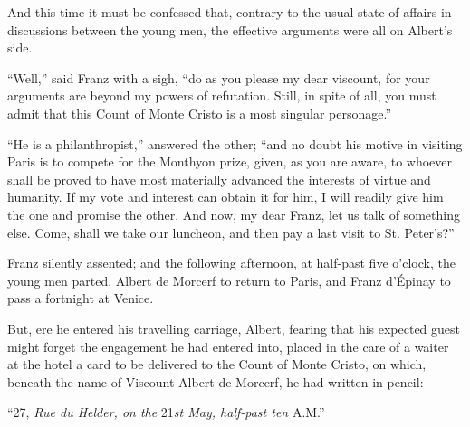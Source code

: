 And this time it must be confessed that, contrary to the usual state of
affairs in discussions between the young men, the effective arguments
were all on Albert’s side.

“Well,” said Franz with a sigh, “do as you please my dear viscount, for
your arguments are beyond my powers of refutation. Still, in spite of
all, you must admit that this Count of Monte Cristo is a most singular
personage.”

“He is a philanthropist,” answered the other; “and no doubt his motive
in visiting Paris is to compete for the Monthyon prize, given, as you
are aware, to whoever shall be proved to have most materially advanced
the interests of virtue and humanity. If my vote and interest can
obtain it for him, I will readily give him the one and promise the
other. And now, my dear Franz, let us talk of something else. Come,
shall we take our luncheon, and then pay a last visit to St. Peter’s?”

Franz silently assented; and the following afternoon, at half-past five
o’clock, the young men parted. Albert de Morcerf to return to Paris,
and Franz d’Épinay to pass a fortnight at Venice.

But, ere he entered his travelling carriage, Albert, fearing that his
expected guest might forget the engagement he had entered into, placed
in the care of a waiter at the hotel a card to be delivered to the
Count of Monte Cristo, on which, beneath the name of Viscount Albert de
Morcerf, he had written in pencil:

“27, \textit{Rue du Helder, on the} 21\textit{st May, half-past ten} A.M.”
